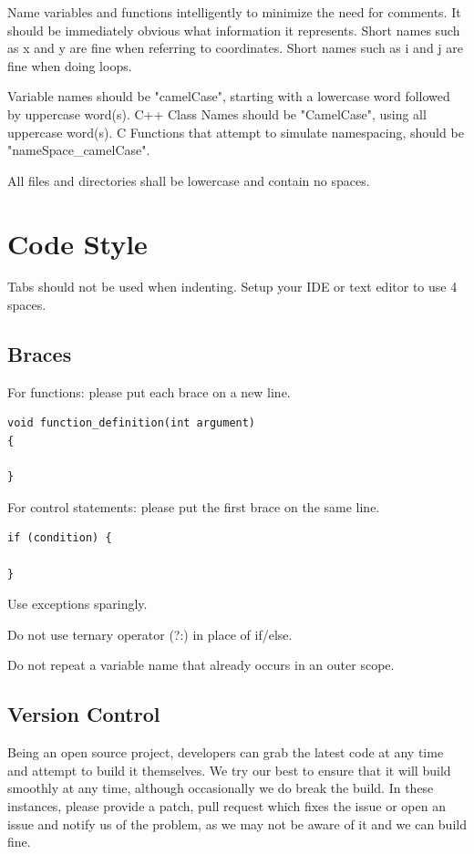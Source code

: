 \documentclass{report}
\begin{document}
Name variables and functions intelligently to minimize the need for
comments. It should be immediately obvious what information it
represents. Short names such as x and y are fine when referring to
coordinates. Short names such as i and j are fine when doing loops.

Variable names should be "camelCase", starting with a lowercase word
followed by uppercase word(s). C++ Class Names should be "CamelCase",
using all uppercase word(s). C Functions that attempt to simulate namespacing, should be "nameSpace\_camelCase".

All files and directories shall be lowercase and contain no spaces.

\section{Code Style}

Tabs should not be used when indenting. Setup your IDE or text editor to
use 4 spaces.

\subsection{Braces}

For functions: please put each brace on a new line.

\begin{verbatim}
void function_definition(int argument)
{

}
\end{verbatim}

For control statements: please put the first brace on the same line.

\begin{verbatim}
if (condition) {

}
\end{verbatim}

Use exceptions sparingly.

Do not use ternary operator (?:) in place of if/else.

Do not repeat a variable name that already occurs in an outer scope.

\subsection{Version Control}

Being an open source project, developers can grab the latest code at any
time and attempt to build it themselves. We try our best to ensure that
it will build smoothly at any time, although occasionally we do break
the build. In these instances, please provide a patch, pull request
which fixes the issue or open an issue and notify us of the problem, as
we may not be aware of it and we can build fine.
\end{document}
